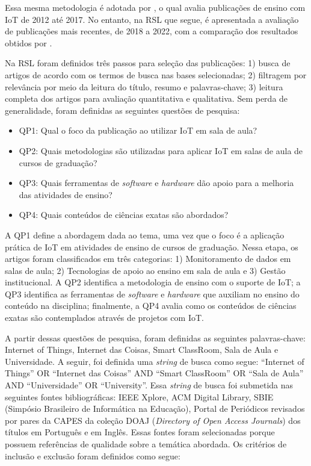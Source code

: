 \documentclass[portuguese]{textolivre}
\begin{document}
Essa mesma metodologia é adotada por \textcite{lopes_smart_2018}, o qual avalia publicações de ensino com IoT de 2012 até 2017. No entanto, na RSL que segue, é apresentada a avaliação de publicações mais recentes, de 2018 a 2022, com a comparação dos resultados obtidos por \textcite{lopes_smart_2018}.

Na RSL foram definidos três passos para seleção das publicações: 1) busca de artigos de acordo com os termos de busca nas bases selecionadas; 2) filtragem por relevância por meio da leitura do título, resumo e palavras-chave; 3) leitura completa dos artigos para avaliação quantitativa e qualitativa. Sem perda de generalidade, foram definidas as seguintes questões de pesquisa:

\begin{itemize}
    \item QP1: Qual o foco da publicação ao utilizar IoT em sala de aula?
    \item QP2: Quais metodologias são utilizadas para aplicar IoT em salas de aula de cursos de graduação?
    \item QP3: Quais ferramentas de \textit{software} e \textit{hardware} dão apoio para a melhoria das atividades de ensino?
    \item QP4: Quais conteúdos de ciências exatas são abordados?
\end{itemize}
    
 A QP1 define a abordagem dada ao tema, uma vez que o foco é a aplicação prática de IoT em atividades de ensino de cursos de graduação. Nessa etapa, os artigos foram classificados em três categorias: 1) Monitoramento de dados em salas de aula; 2) Tecnologias de apoio ao ensino em sala de aula e 3) Gestão institucional. A QP2 identifica a metodologia de ensino com o suporte de IoT; a QP3 identifica as ferramentas de \textit{software} e \textit{hardware} que auxiliam no ensino do conteúdo na disciplina; finalmente, a QP4 avalia como os conteúdos de ciências exatas são contemplados através de projetos com IoT.
 
A partir dessas questões de pesquisa, foram definidas as seguintes palavras-chave: Internet of Things, Internet das Coisas, Smart ClassRoom, Sala de Aula e Universidade. A seguir, foi definida uma \textit{string} de busca como segue: “Internet of Things” OR “Internet das Coisas” AND “Smart ClassRoom” OR “Sala de Aula” AND “Universidade” OR “University”. Essa \textit{string} de busca foi submetida nas seguintes fontes bibliográficas: IEEE Xplore, ACM Digital Library, SBIE (Simpósio Brasileiro de Informática na Educação), Portal de Periódicos revisados por pares da CAPES da coleção DOAJ (\textit{Directory of Open Access Journals}) dos títulos em Português e em Inglês. Essas fontes foram selecionadas porque possuem referências de qualidade sobre a temática abordada. Os critérios de inclusão e exclusão foram definidos como segue:
\end{document}
